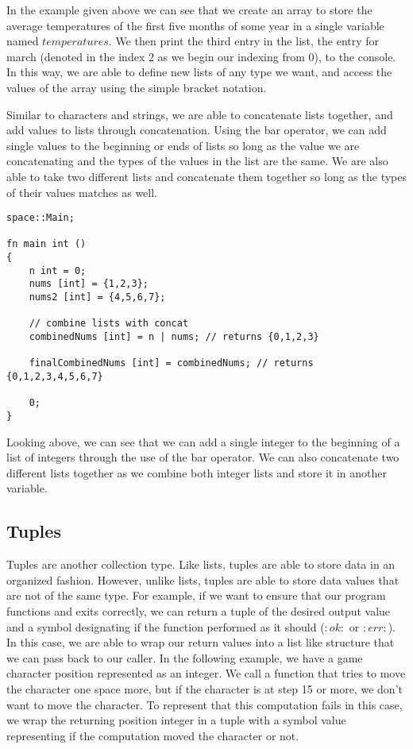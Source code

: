 \documentclass{article}
\begin{document}
In the example given above we can see that we create an array to store the average temperatures of the first five months of some year in a single variable named $temperatures$.
We then print the third entry in the list, the entry for march (denoted in the index 2 as we begin our indexing from 0), to the console. In this way, we are able to define
new lists of any type we want, and access the values of the array using the simple bracket notation.

Similar to characters and strings, we are able to concatenate lists together, and add values to lists through concatenation. Using the bar operator, we can add single
values to the beginning or ends of lists so long as the value we are concatenating and the types of the values in the list are the same. We are also able to take two
different lists and concatenate them together so long as the types of their values matches as well.

\begin{lstlisting}
space::Main;

fn main int ()
{
	n int = 0;
	nums [int] = {1,2,3};
	nums2 [int] = {4,5,6,7};

	// combine lists with concat
	combinedNums [int] = n | nums; // returns {0,1,2,3}

	finalCombinedNums [int] = combinedNums; // returns {0,1,2,3,4,5,6,7}

	0;
}
\end{lstlisting}

Looking above, we can see that we can add a single integer to the beginning of a list of integers through the use of the bar operator. We can also concatenate two
different lists together as we combine both integer lists and store it in another variable.


\subsection{Tuples}

Tuples are another collection type. Like lists, tuples are able to store data in an organized fashion. However, unlike lists, tuples are able to store data values that are
not of the same type. For example, if we want to ensure that our program functions and exits correctly, we can return a tuple of the desired output value and a symbol designating
if the function performed as it should ($:ok:$ or $:err:$). In this case, we are able to wrap our return values into a list like structure that we can pass back to our caller. In
the following example, we have a game character position represented as an integer. We call a function that tries to move the character one space more, but if the character is
at step 15 or more, we don't want to move the character. To represent that this computation fails in this case, we wrap the returning position integer in a tuple with a symbol
value representing if the computation moved the character or not.
\end{document}

